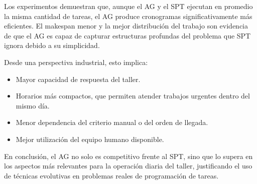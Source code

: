 Los experimentos demuestran que, aunque el AG y el SPT ejecutan en promedio la misma cantidad de tareas, el AG produce cronogramas significativamente más eficientes. El makespan menor y la mejor distribución del trabajo son evidencia de que el AG es capaz de capturar estructuras profundas del problema que SPT ignora debido a su simplicidad.

Desde una perspectiva industrial, esto implica:

\begin{itemize}
    \item Mayor capacidad de respuesta del taller.
    \item Horarios más compactos, que permiten atender trabajos urgentes dentro del mismo día.
    \item Menor dependencia del criterio manual o del orden de llegada.
    \item Mejor utilización del equipo humano disponible.
\end{itemize}

En conclusión, el AG no solo es competitivo frente al SPT, sino que lo supera en los aspectos más relevantes para la operación diaria del taller, justificando el uso de técnicas evolutivas en problemas reales de programación de tareas.
